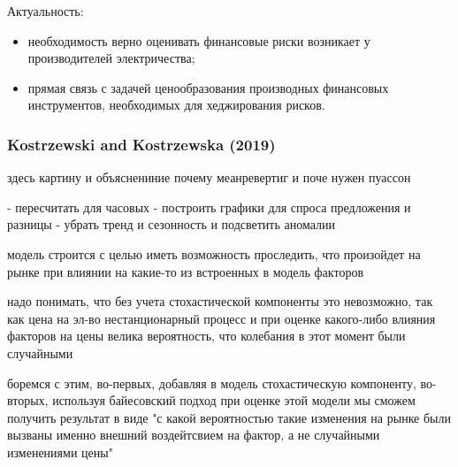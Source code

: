 \documentclass[c, dvipsnames]{beamer}  %
\begin{document}
\begin{frame}[shrink=3]
\begin{block}{Актуальность:}
\begin{itemize}
		
		\item необходимость верно оценивать финансовые риски возникает у производителей электричества; %
		\item прямая связь с задачей ценообразования производных финансовых инструментов, необходимых для хеджирования  рисков. 
		
		
	\end{itemize}
\end{block}


\end{frame}



\begin{frame}[shrink=5]
\frametitle{ Kostrzewski and Kostrzewska (2019)} 


здесь картину и объяснениние почему меанревертиг и поче нужен пуассон

- пересчитать для часовых
- построить графики для спроса предложения и разницы
- убрать тренд и сезонность и подсветить аномалии

 модель строится с целью иметь возможность проследить, что произойдет на рынке при влиянии на какие-то из встроенных в модель факторов 


 надо понимать, что без учета стохастической компоненты это невозможно, так как цена на эл-во нестанционарный процесс и при оценке  какого-либо  влияния факторов на цены велика вероятность, что колебания в этот момент были случайными  


 боремся с этим, во-первых, добавляя в модель стохастическую компоненту, во-вторых, используя байесовский подход при оценке этой модели мы сможем получить результат в виде "с какой вероятностью такие изменения на рынке были вызваны именно внешний воздейтсвием на фактор, а не случайными изменениями цены"


\end{frame}
\end{document}
